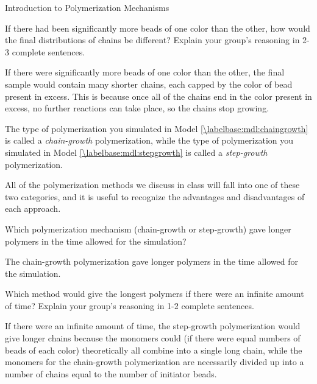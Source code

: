 \begin{activity}{Introduction to Polymerization Mechanisms}
\begin{ctqs}
	\question If there had been significantly more beads of one color than the other, how would the final distributions of chains be different?  Explain your group's reasoning in 2-3 complete sentences.
	
		\begin{solution}[2in]{}
			If there were significantly more beads of one color than the other, the final sample would contain many shorter chains, each capped by the color of bead present in excess.  This is because once all of the chains end in the color present in excess, no further reactions can take place, so the chains stop growing.
		\end{solution}
	
\end{ctqs}

\begin{infobox}
	The type of polymerization you simulated in Model  \ref{\labelbase:mdl:chaingrowth} is called a \emph{chain-growth} polymerization, while the type of polymerization you simulated in Model  \ref{\labelbase:mdl:stepgrowth} is called a \emph{step-growth} polymerization.
	
	All of the polymerization methods we discuss in class will fall into one of these two categories, and it is useful to recognize the advantages and disadvantages of each approach.
\end{infobox}

\begin{ctqs}
	\question Which polymerization mechanism (chain-growth or step-growth) gave longer polymers in the time allowed for the simulation?
	
		\begin{solution}[1in]{}
			The chain-growth polymerization gave longer polymers in the time allowed for the simulation.
		\end{solution}
	
	\question Which method would give the longest polymers if there were an infinite amount of time?  Explain your group's reasoning in 1-2 complete sentences.
	
		\begin{solution}[1.75in]{}
			If there were an infinite amount of time, the step-growth polymerization would give longer chains because the monomers could (if there were equal numbers of beads of each color) theoretically all combine into a single long chain, while the monomers for the chain-growth polymerization are necessarily divided up into a number of chains equal to the number of initiator beads.
		\end{solution}
	

\end{ctqs}
\end{activity}
